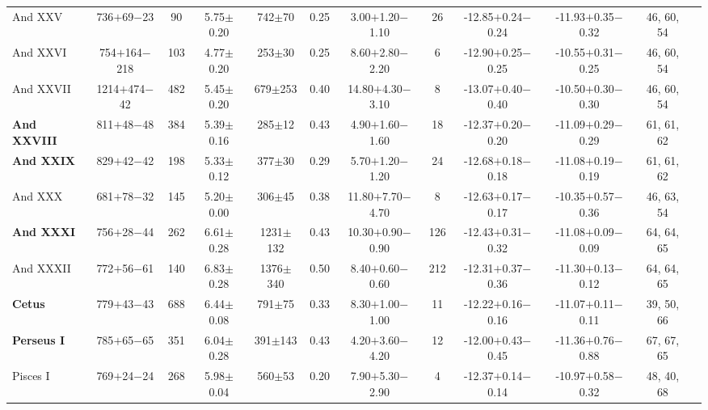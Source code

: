 \begin{table*}
\begin{center}
{\begin{tabular}{lccccccccccc}
And XXV & 736$+$69$-$23 & 90 & 5.75$\pm$0.20 & 742$\pm$70 & 0.25 & 3.00$+$1.20$-$1.10 & 26 & -12.85$+$0.24$-$0.24 & -11.93$+$0.35$-$0.32 & 46, 60, 54\\
And XXVI & 754$+$164$-$218 & 103 & 4.77$\pm$0.20 & 253$\pm$30 & 0.25 & 8.60$+$2.80$-$2.20 & 6 & -12.90$+$0.25$-$0.25 & -10.55$+$0.31$-$0.25 & 46, 60, 54\\
And XXVII & 1214$+$474$-$42 & 482 & 5.45$\pm$0.20 & 679$\pm$253 & 0.40 & 14.80$+$4.30$-$3.10 & 8 & -13.07$+$0.40$-$0.40 & -10.50$+$0.30$-$0.30 & 46, 60, 54\\
\textbf{And XXVIII} & 811$+$48$-$48 & 384 & 5.39$\pm$0.16 & 285$\pm$12 & 0.43 & 4.90$+$1.60$-$1.60 & 18 & -12.37$+$0.20$-$0.20 & -11.09$+$0.29$-$0.29 & 61, 61, 62\\
\textbf{And XXIX} & 829$+$42$-$42 & 198 & 5.33$\pm$0.12 & 377$\pm$30 & 0.29 & 5.70$+$1.20$-$1.20 & 24 & -12.68$+$0.18$-$0.18 & -11.08$+$0.19$-$0.19 & 61, 61, 62\\
And XXX & 681$+$78$-$32 & 145 & 5.20$\pm$0.00 & 306$\pm$45 & 0.38 & 11.80$+$7.70$-$4.70 & 8 & -12.63$+$0.17$-$0.17 & -10.35$+$0.57$-$0.36 & 46, 63, 54\\
\textbf{And XXXI} & 756$+$28$-$44 & 262 & 6.61$\pm$0.28 & 1231$\pm$132 & 0.43 & 10.30$+$0.90$-$0.90 & 126 & -12.43$+$0.31$-$0.32 & -11.08$+$0.09$-$0.09 & 64, 64, 65\\
And XXXII & 772$+$56$-$61 & 140 & 6.83$\pm$0.28 & 1376$\pm$340 & 0.50 & 8.40$+$0.60$-$0.60 & 212 & -12.31$+$0.37$-$0.36 & -11.30$+$0.13$-$0.12 & 64, 64, 65\\
\textbf{Cetus} & 779$+$43$-$43 & 688 & 6.44$\pm$0.08 & 791$\pm$75 & 0.33 & 8.30$+$1.00$-$1.00 & 11 & -12.22$+$0.16$-$0.16 & -11.07$+$0.11$-$0.11 & 39, 50, 66\\
\textbf{Perseus I} & 785$+$65$-$65 & 351 & 6.04$\pm$0.28 & 391$\pm$143 & 0.43 & 4.20$+$3.60$-$4.20 & 12 & -12.00$+$0.43$-$0.45 & -11.36$+$0.76$-$0.88 & 67, 67, 65\\
Pisces I & 769$+$24$-$24 & 268 & 5.98$\pm$0.04 & 560$\pm$53 & 0.20 & 7.90$+$5.30$-$2.90 & 4 & -12.37$+$0.14$-$0.14 & -10.97$+$0.58$-$0.32 & 48, 40, 68\\
\hline
\end{tabular}
}
\label{tab:dSph}
\end{center}
\end{table*}
